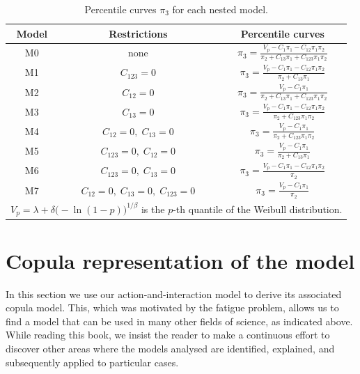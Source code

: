 \begin{table}[h]
\centering
\setlength{\tabcolsep}{15pt}
\renewcommand{\arraystretch}{2.5}
\caption{Percentile curves \(\pi_3\) for each nested model.}
\label{tab:percentile_curves}
\begin{tabular}{@{}ccc@{}}
\toprule
\textbf{Model} & \textbf{Restrictions} & \textbf{Percentile curves} \\
\midrule
M0 & none & \(\displaystyle \pi_3 = \frac{V_p - C_1\pi_1 - C_{12}\pi_1\pi_2}{\pi_2 + C_{13}\pi_1 + C_{123}\pi_1\pi_2}\) \\
M1 & \(C_{123}=0\) & \(\displaystyle \pi_3 = \frac{V_p - C_1\pi_1 - C_{12}\pi_1\pi_2}{\pi_2 + C_{13}\pi_1}\) \\
M2 & \(C_{12}=0\) & \(\displaystyle \pi_3 = \frac{V_p - C_1\pi_1}{\pi_2 + C_{13}\pi_1 + C_{123}\pi_1\pi_2}\) \\
M3 & \(C_{13}=0\) & \(\displaystyle \pi_3 = \frac{V_p - C_1\pi_1 - C_{12}\pi_1\pi_2}{\pi_2 + C_{123}\pi_1\pi_2}\) \\
M4 & \(C_{12}=0,\; C_{13}=0\) & \(\displaystyle \pi_3 = \frac{V_p - C_1\pi_1}{\pi_2 + C_{123}\pi_1\pi_2}\) \\
M5 & \(C_{123}=0,\; C_{12}=0\) & \(\displaystyle \pi_3 = \frac{V_p - C_1\pi_1}{\pi_2 + C_{13}\pi_1}\) \\
M6 & \(C_{123}=0,\; C_{13}=0\) & \(\displaystyle \pi_3 = \frac{V_p - C_1\pi_1 - C_{12}\pi_1\pi_2}{\pi_2}\) \\
M7 & \(C_{12}=0,\; C_{13}=0,\; C_{123}=0\) & \(\displaystyle \pi_3 = \frac{V_p - C_1\pi_1}{\pi_2}\) \\
\midrule
\multicolumn{3}{c}{\(V_p = \lambda + \delta\bigl(-\ln(1-p)\bigr)^{1/\beta}\) is the \(p\)-th quantile of the Weibull distribution.} \\
\bottomrule
\end{tabular}
\end{table}

\section{Copula representation of the model}
\label{sec:copula}
In this section we use our action‑and‑interaction model to derive its associated copula model. This, which was motivated by the fatigue problem, allows us to find a model that can be used in many other fields of science, as indicated above. While reading this book, we insist the reader to make a continuous effort to discover other areas where the models analysed are identified, explained, and subsequently applied to particular cases.

